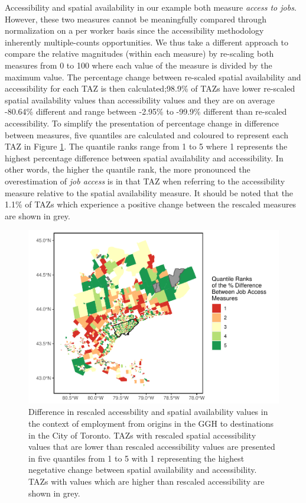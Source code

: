 \documentclass[]{elsarticle} %
\begin{document}
Accessibility and spatial availability in our example both measure
\emph{access to jobs}. However, these two measures cannot be
meaningfully compared through normalization on a per worker basis since
the accessibility methodology inherently multiple-counts opportunities.
We thus take a different approach to compare the relative magnitudes
(within each measure) by re-scaling both measures from 0 to 100 where
each value of the measure is divided by the maximum value. The
percentage change between re-scaled spatial availability and
accessibility for each TAZ is then calculated;98.9\% of TAZs have lower
re-scaled spatial availability values than accessibility values and they
are on average -80.64\% different and range between -2.95\% to -99.9\%
different than re-scaled accessibility. To simplify the presentation of
percentage change in difference between measures, five quantiles are
calculated and coloured to represent each TAZ in Figure
\ref{fig:indexed-measures-comparison-plot}. The quantile ranks range
from 1 to 5 where 1 represents the highest percentage difference between
spatial availability and accessibility. In other words, the higher the
quantile rank, the more pronounced the overestimation of \emph{job
access} is in that TAZ when referring to the accessibility measure
relative to the spatial availability measure. It should be noted that
the 1.1\% of TAZs which experience a positive change between the
rescaled measures are shown in grey.

\begin{figure}
\includegraphics[width=1\linewidth]{Spatial-Availability_files/figure-latex/indexed-measures-comparison-plot-1} \caption{\label{fig:indexed-measures-comparison-plot}Difference in rescaled accessbility and spatial availability values in the context of employment from origins in the GGH to destinations in the City of Toronto. TAZs with rescaled spatial accessibility values that are lower than rescaled accessibility values are presented in five quantiles from 1 to 5 with 1 representing the highest negetative change between spatial availability and accessibility. TAZs with values which are higher than rescaled accessibility are shown in grey.}\label{fig:indexed-measures-comparison-plot}
\end{figure}
\end{document}
